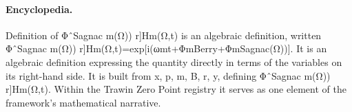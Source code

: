 \paragraph{Encyclopedia.}
Definition of ΦˆSagnac m(Ω)) r]Hm(Ω,t) is an algebraic definition, written ΦˆSagnac m(Ω)) r]Hm(Ω,t)=exp[i(ωmt+ΦmBerry+ΦmSagnac(Ω))]. It is an algebraic definition expressing the quantity directly in terms of the variables on its right-hand side. It is built from x, p, m, B, r, y, defining ΦˆSagnac m(Ω)) r]Hm(Ω,t). Within the Trawin Zero Point registry it serves as one element of the framework's mathematical narrative.
